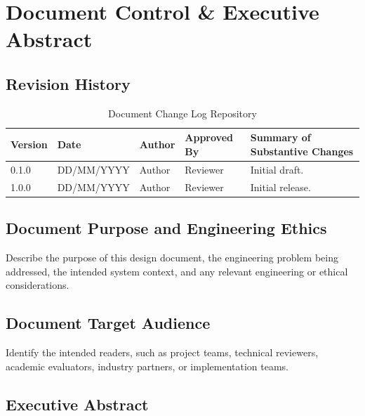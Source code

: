 
\section{Document Control \& Executive Abstract}

\subsection{Revision History}

\begin{table}[!htbp]
    \centering
    \small
    \begin{tabular}{llllp{6cm}}
        \toprule
        \textbf{Version} &
        \textbf{Date} &
        \textbf{Author} &
        \textbf{Approved By} &
        \textbf{Summary of Substantive Changes} \\
        \midrule
        0.1.0 & DD/MM/YYYY & Author & Reviewer & Initial draft. \\
        1.0.0 & DD/MM/YYYY & Author & Reviewer & Initial release. \\
        \bottomrule
    \end{tabular}
    \caption{Document Change Log Repository}
\end{table}

\subsection{Document Purpose and Engineering Ethics}

Describe the purpose of this design document, the engineering problem being addressed,
the intended system context, and any relevant engineering or ethical considerations.

\subsection{Document Target Audience}

Identify the intended readers, such as project teams, technical reviewers,
academic evaluators, industry partners, or implementation teams.

\newpage

\subsection{Executive Abstract}


